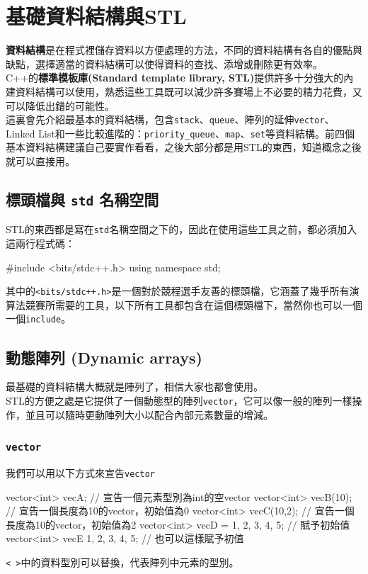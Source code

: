 \documentclass[main.tex]{subfiles}
\begin{document}
\chapter{基礎資料結構與STL}
\textbf{資料結構}是在程式裡儲存資料以方便處理的方法，不同的資料結構有各自的優點與缺點，選擇適當的資料結構可以使得資料的查找、添增或刪除更有效率。\\
\indent C++的\textbf{標準模板庫(Standard template library, STL)}提供許多十分強大的內建資料結構可以使用，熟悉這些工具既可以減少許多賽場上不必要的精力花費，又可以降低出錯的可能性。\\

這裏會先介紹最基本的資料結構，包含\texttt{stack}、\texttt{queue}、陣列的延伸\texttt{vector}、Linked List和一些比較進階的：\texttt{priority\_queue}、\texttt{map}、\texttt{set}等資料結構。前四個基本資料結構建議自己要實作看看，之後大部分都是用STL的東西，知道概念之後就可以直接用。\\


\section{標頭檔與 \texttt{std} 名稱空間}
STL的東西都是寫在\texttt{std}名稱空間之下的，因此在使用這些工具之前，都必須加入這兩行程式碼：
\begin{C++}
#include <bits/stdc++.h>
using namespace std;
\end{C++}

\indent 其中的\texttt{<bits/stdc++.h>}是一個對於競程選手友善的標頭檔，它涵蓋了幾乎所有演算法競賽所需要的工具，以下所有工具都包含在這個標頭檔下，當然你也可以一個一個\texttt{include}。

\section{動態陣列 (Dynamic arrays)}
最基礎的資料結構大概就是陣列了，相信大家也都會使用。\\
\indent STL的方便之處是它提供了一個動態型的陣列\texttt{vector}，它可以像一般的陣列一樣操作，並且可以隨時更動陣列大小以配合內部元素數量的增減。

\subsection{\texttt{vector}}
我們可以用以下方式來宣告\texttt{vector}
\begin{C++}
vector<int> vecA;
// 宣告一個元素型別為int的空vector
vector<int> vecB(10);
// 宣告一個長度為10的vector，初始值為0
vector<int> vecC(10,2);
// 宣告一個長度為10的vector，初始值為2
vector<int> vecD = {1, 2, 3, 4, 5}; // 賦予初始值
vector<int> vecE {1, 2, 3, 4, 5}; // 也可以這樣賦予初值
\end{C++}
\indent \texttt{< >}中的資料型別可以替換，代表陣列中元素的型別。\\
\end{document}

